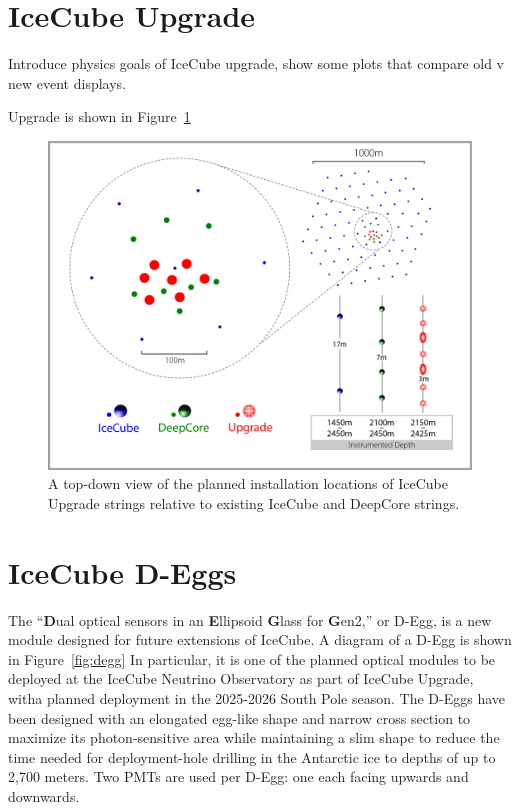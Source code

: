 \documentclass[main.tex]{subfiles}
\begin{document}
\section{IceCube Upgrade}

Introduce physics goals of IceCube upgrade, show some plots that compare old v new event displays. 

Upgrade is shown in Figure~\ref{fig:upgrade_layout}

\begin{figure}
    \centering
    \includegraphics[width=\linewidth]{figures/ICUpgradeLayout_V4b.jpg}
    \caption{A top-down view of the planned installation locations of IceCube Upgrade strings relative to existing IceCube and DeepCore strings.}
    \label{fig:upgrade_layout}
\end{figure}

\section{IceCube D-Eggs}

The ``\textbf{D}ual optical sensors in an \textbf{E}llipsoid \textbf{G}lass for \textbf{G}en2,'' or D-Egg, is a new module designed for future extensions of IceCube. 
A diagram of a D-Egg is shown in Figure~\ref{fig:degg}
In particular, it is one of the planned optical modules to be deployed at the IceCube Neutrino Observatory as part of IceCube Upgrade, witha planned deployment in the 2025-2026 South Pole season.
The D-Eggs have been designed with an elongated egg-like shape and narrow cross section to maximize its photon-sensitive area while maintaining a slim shape to reduce the time needed for deployment-hole drilling in the Antarctic ice to depths of up to 2,700 meters. 
Two PMTs are used per D-Egg: one each facing upwards and downwards. 
\end{document}
